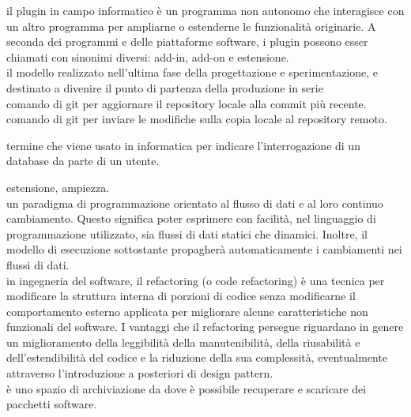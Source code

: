 \documentclass{scalatekids-article}
\begin{document}
   il plugin in campo informatico è un programma non autonomo che interagisce con un altro programma per ampliarne o estenderne le funzionalità originarie.
  A seconda dei programmi e delle piattaforme software, i plugin possono esser chiamati con sinonimi diversi: add-in, add-on e estensione.
  \\

   il modello realizzato nell’ultima fase della progettazione e sperimentazione, e destinato a divenire il punto di partenza della produzione in serie
  \\

   comando di git per aggiornare il repository locale alla commit più recente.
  \\

   comando di git per inviare le modifiche sulla copia locale al repository remoto.
  \\


   termine che viene usato in informatica per indicare l'interrogazione di un database da parte di un utente.
  \\

  
   estensione, ampiezza.
  \\
  
   un paradigma di programmazione orientato al flusso di dati e al loro continuo cambiamento. 
  Questo significa poter esprimere con facilità, nel linguaggio di programmazione utilizzato, sia flussi di dati statici che dinamici.
  Inoltre, il modello di esecuzione sottostante propagherà automaticamente i cambiamenti nei flussi di dati. 
  \\

   in ingegneria del software, il refactoring (o code refactoring) è una tecnica per modificare la struttura interna di porzioni di codice senza modificarne il comportamento esterno applicata per migliorare alcune caratteristiche non funzionali del software.
  I vantaggi che il refactoring persegue riguardano in genere un miglioramento della leggibilità della manutenibilità, della riusabilità e dell'estendibilità del codice e la riduzione della sua complessità, eventualmente attraverso l'introduzione a posteriori di design pattern.
  \\

   è uno spazio di archiviazione da dove è possibile recuperare e scaricare dei pacchetti software.
  \\
\end{document}
